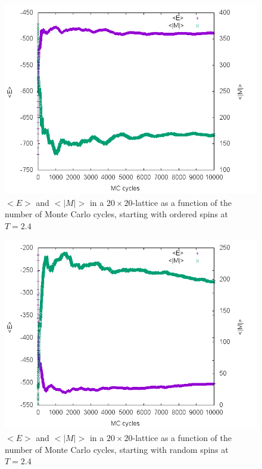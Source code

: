 \documentclass[10pt,a4paper]{article}
\begin{document}
\begin{figure}[h]
	\includegraphics[width=\textwidth]{a24o.png}
	\caption{$<E>$ and $<|M|>$ in a $20\times 20$-lattice as a function of the number of Monte Carlo cycles\label{b_chi}, starting with ordered spins at $T=2.4$}
\end{figure}
\begin{figure}[h]
	\includegraphics[width=\textwidth]{a24r.png}
	\caption{$<E>$ and $<|M|>$ in a $20\times 20$-lattice as a function of the number of Monte Carlo cycles\label{b_chi}, starting with random spins at $T=2.4$}
\end{figure}
\end{document}

